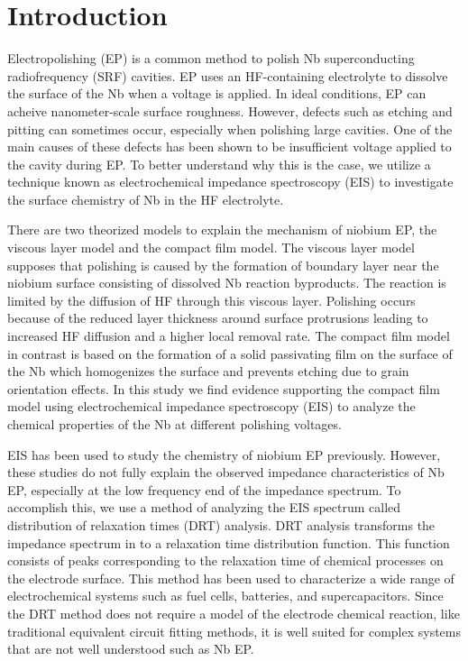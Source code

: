 \section{Introduction}
\label{sec:org5ef967f}
Electropolishing (EP) is a common method to polish Nb superconducting radiofrequency (SRF) cavities. EP uses an HF-containing electrolyte to dissolve the surface of the Nb when a voltage is applied. In ideal conditions, EP can acheive nanometer-scale surface roughness. However, defects such as etching and pitting can sometimes occur, especially when polishing large cavities. One of the main causes of these defects has been shown to be insufficient voltage applied to the cavity during EP.\cite{chouhan2022study,viklund2022studies,chouhan2023electropolishing} To better understand why this is the case, we utilize a technique known as electrochemical impedance spectroscopy (EIS) to investigate the surface chemistry of Nb in the HF electrolyte.

There are two theorized models to explain the mechanism of niobium EP, the viscous layer model and the compact film model. The viscous layer model supposes that polishing is caused by the formation of boundary layer near the niobium surface consisting of dissolved Nb reaction byproducts. The reaction is limited by the diffusion of HF through this viscous layer. Polishing occurs because of the reduced layer thickness around surface protrusions leading to increased HF diffusion and a higher local removal rate. The compact film model in contrast is based on the formation of a solid passivating film on the surface of the Nb which homogenizes the surface and prevents etching due to grain orientation effects. In this study we find evidence supporting the compact film model using electrochemical impedance spectroscopy (EIS) to analyze the chemical properties of the Nb at different polishing voltages.

EIS has been used to study the chemistry of niobium EP previously.\cite{cattarin2002nb, Tian_2008, tian2008novel, ranjith2018anodic} However, these studies do not fully explain the observed impedance characteristics of Nb EP, especially at the low frequency end of the impedance spectrum. To accomplish this, we use a method of analyzing the EIS spectrum called distribution of relaxation times (DRT) analysis.\cite{10.1063/1.1745355, wan2015influence, ZHANG2015464} DRT analysis transforms the impedance spectrum in to a relaxation time distribution function. This function consists of peaks corresponding to the relaxation time of chemical processes on the electrode surface. This method has been used to characterize a wide range of electrochemical systems such as fuel cells,\cite{Sonn_2008, schichlein2002deconvolution, Leonide_2008} batteries,\cite{SCHMIDT201370, batteries5020043, SONI202297} and supercapacitors.\cite{HELSETH2019100912} Since the DRT method does not require a model of the electrode chemical reaction, like traditional equivalent circuit fitting methods, it is well suited for complex systems that are not well understood such as Nb EP. 

